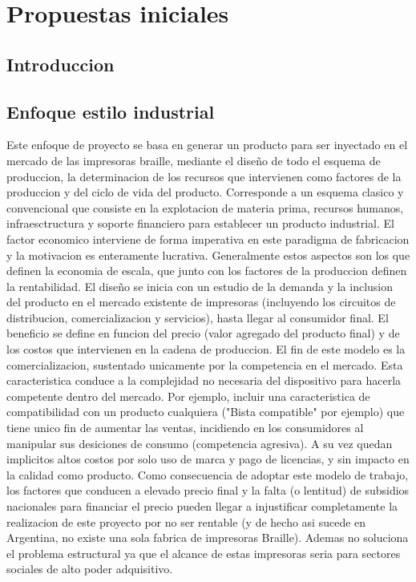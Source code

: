 \chapter{Propuestas iniciales}
\section{Introduccion} 
\section {Enfoque estilo industrial}
Este enfoque de proyecto se basa en generar un producto para ser inyectado en
el mercado de las impresoras braille, mediante el dise\~no de todo el esquema de
produccion, la determinacion de los recursos que intervienen como factores de
la produccion y del ciclo de vida del producto. Corresponde a un esquema clasico
y convencional que consiste en la explotacion de materia prima, recursos
humanos, infraesctructura y soporte financiero para establecer un producto
industrial. El factor economico interviene de forma imperativa en este
paradigma de fabricacion y la motivacion es enteramente lucrativa. 
Generalmente estos aspectos son los que definen la economia de escala, que
junto con los factores de la produccion definen la rentabilidad.
El dise\~no se inicia con un estudio de la demanda y la inclusion del producto en
el mercado existente de impresoras (incluyendo los circuitos de distribucion, 
comercializacion y servicios), hasta llegar al consumidor final.
El beneficio se define en funcion del precio (valor agregado del producto
final) y de los costos que intervienen en la cadena de produccion. 
El fin de este modelo es la comercializacion, sustentado unicamente por la
competencia en el mercado. 
Esta caracteristica conduce a la complejidad no necesaria del dispositivo para
hacerla competente dentro del mercado. Por ejemplo, incluir una caracteristica
de compatibilidad con un producto cualquiera ("Bista compatible" por ejemplo) 
que tiene unico fin de aumentar las ventas, incidiendo en los consumidores al
manipular sus desiciones de consumo (competencia agresiva).
A su vez quedan implicitos altos costos por solo uso de marca y pago de 
licencias, y sin impacto en la calidad como producto.
Como consecuencia de adoptar este modelo de trabajo, los factores que conducen
a elevado precio final y la falta (o lentitud) de subsidios nacionales
para financiar el precio pueden llegar a injustificar completamente la 
realizacion de este proyecto por no ser rentable (y de hecho asi sucede en
Argentina, no existe una sola fabrica de impresoras Braille).
Ademas no soluciona el problema estructural ya que el alcance de estas
impresoras seria para sectores sociales de alto poder adquisitivo.
